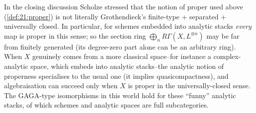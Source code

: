 \begin{remark}
\label{rmk:21:properness-comparison}
In the closing discussion Scholze stressed that the notion of proper used above
(\cref{def:21:proper}) is not literally Grothendieck's finite-type + separated +
universally closed. In particular, for schemes embedded into analytic stacks
\emph{every} map is proper in this sense; so the section ring
$\bigoplus_n R\Gamma(X,L^{\otimes n})$ may be far from finitely generated (its
degree-zero part alone can be an arbitrary ring). When $X$ genuinely comes from a
more classical space--for instance a complex-analytic space, which embeds into
analytic stacks--the analytic notion of properness specialises to the usual one
(it implies quasicompactness), and algebraisation can succeed only when $X$ is
proper in the universally-closed sense. The GAGA-type isomorphisms in this world
hold for these ``funny'' analytic stacks, of which schemes and analytic spaces
are full subcategories.
\end{remark}
